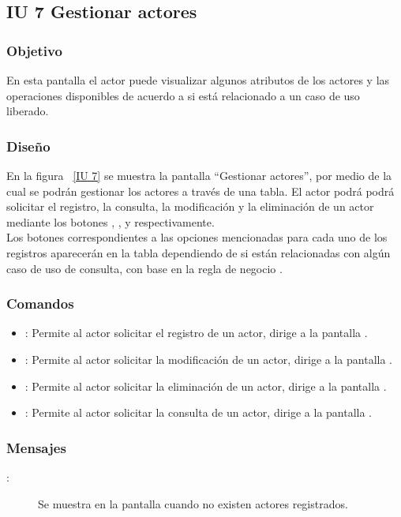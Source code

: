 \subsection{IU 7 Gestionar actores}
\subsubsection{Objetivo}
	
	En esta pantalla el actor puede visualizar algunos atributos de los actores y las operaciones disponibles de acuerdo a si está relacionado a un caso de uso liberado.

\subsubsection{Diseño}

    En la figura ~\ref{IU 7} se muestra la pantalla ``Gestionar actores'', por medio de la cual 
    se podrán gestionar los actores a través de una tabla.
    El actor podrá podrá solicitar el registro, la consulta, la modificación y la eliminación de un actor mediante los botones
    , \btnConsulta, \btnEditar y \btnEliminar respectivamente. \\
    
    Los botones correspondientes a las opciones mencionadas para cada uno de los registros aparecerán en la tabla dependiendo de
    si están relacionadas con algún caso de uso de consulta, con base en la regla de negocio .



\subsubsection{Comandos}
\begin{itemize}
	\item {}: Permite al actor solicitar el registro de un actor, dirige a la pantalla .
	\item \btnEditar[Modificar]: Permite al actor solicitar la modificación de un actor, dirige a la pantalla .
	\item \btnEliminar[Eliminar]: Permite al actor solicitar la eliminación de un actor, dirige a la pantalla .
	\item \btnConsulta[Consultar]: Permite al actor solicitar la consulta de un actor, dirige a la pantalla .
\end{itemize}

\subsubsection{Mensajes}

	
\begin{description}
	\item[:] Se muestra en la pantalla  cuando no existen actores registrados.
\end{description}

